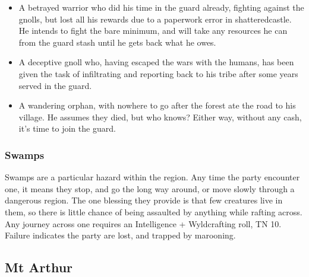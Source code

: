 \begin{multicols}{2}
{\begin{itemize}
    \item
    A betrayed warrior who did his time in the \gls{guard} already, fighting against the gnolls, but lost all his rewards due to a paperwork error in \gls{shatteredcastle}.
    He intends to fight the bare minimum, and will take any resources he can from the \gls{guard} stash until he gets back what he owes.
    \item
    A deceptive gnoll who, having escaped the wars with the humans, has been given the task of infiltrating and reporting back to his tribe after some years served in the \gls{guard}.
    \item
    A wandering orphan, with nowhere to go after the forest ate the road to his village.
    He assumes they died, but who knows?
    Either way, without any cash, it's time to join the \gls{guard}.

  \end{itemize}
}{}

\subsubsection{Swamps}

Swamps are a particular hazard within the region.
Any time the party encounter one, it means they stop, and go the long way around, or move slowly through a dangerous region.
The one blessing they provide is that few creatures live in them, so there is little chance of being assaulted by anything while rafting across.
Any journey across one requires an Intelligence + Wyldcrafting roll, TN 10.
Failure indicates the party are lost, and trapped by marooning.

\subsection{Mt Arthur}

\iftoggle{players}{}{

  \begin{figure*}[t!]
  \begin{nametable}[c||L|L|LLLL|L|L,fontupper=\footnotesize,]{Encounter in Mt Arthur}


\end{nametable}
\end{figure*}}
\end{multicols}

